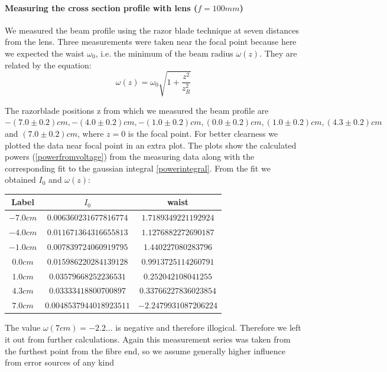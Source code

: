 \documentclass{article}
\begin{document}
\paragraph{Measuring the cross section profile with lens ($f=100mm$)}

We measured the beam profile using the razor blade technique at seven distances from the lens. Three measurements were taken near the focal point because here we expected the waist $\omega_{0}$, i.e. the minimum of the beam radius $\omega (z)$. They are related by the equation:
\begin{equation}
\omega (z) = \omega_{0}\sqrt{1+\frac{z^2}{z_{R}^2}}
\label{omegaofz}
\end{equation}

The razorblade positions z from which we measured the beam profile are $-(7.0\pm 0.2)cm, -(4.0\pm 0.2)cm, -(1.0\pm 0.2)cm, (0.0\pm 0.2)cm, (1.0\pm 0.2)cm, (4.3\pm 0.2) cm$ and $(7.0\pm 0.2)cm$, where $z=0$ is the focal point. For better clearness we plotted the data near focal point in an extra plot. The plots show the calculated powers (\ref{powerfromvoltage}) from the measuring data along with the corresponding fit to the gaussian integral \ref{powerintegral}. From the fit we obtained $I_{0}$ and $\omega(z)$:

\begin{tabular}{ccc} 
  \hline
  Label & $I_{0}$ & waist \\ 
  \hline
  $-7.0 cm$ &$ 0.006360231677816774$ &$ 1.7189349221192924 $\\ 
  \hline
  $-4.0 cm$ &$ 0.011671364316655813$ &$ 1.1276882272690187 $\\ 
  \hline
  $-1.0cm$ &$ 0.007839724060919795$ &$ 1.440227080283796 $\\
  \hline
  $0.0 cm$ &$ 0.015986220284139128$ &$ 0.9913725114260791 $\\ 
  \hline
  $1.0 cm$ &$ 0.03579668252236531$ &$ 0.252042108041255 $ \\
  \hline
  $4.3 cm$ &$ 0.03333418800700897$ & $ 0.33766227836023854$ \\ 
  \hline
  $7.0 cm$ & $0.0048537944018923511$ & $-2.2479931087206224$\\
  \hline 
\end{tabular}

The value $\omega(7cm) = -2.2... $ is negative and therefore illogical. Therefore we left it out from further calculations. Again this measurement series was taken from the furthest point from the fibre end, so we assume generally higher influence from error sources of any kind\\
\end{document}
